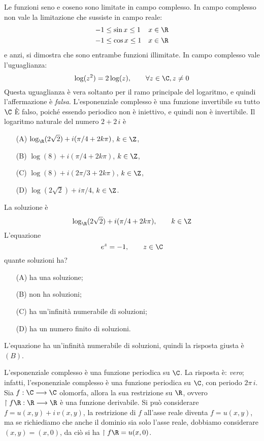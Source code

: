 Le funzioni seno e coseno sono limitate in campo complesso.
    In campo complesso non vale la limitazione che sussiste in campo reale: \begin{align*}
        -1 &\le \sin x \le  1 & x&\in \R \\
        -1 &\le \cos x \le 1 & x&\in \R 
    \end{align*}e anzi, si dimostra che sono entrambe funzioni illimitate.
In campo complesso vale l'uguaglianza: \[\log(z^2)=2\log(z) , \qquad  \forall z \in\C , z\neq0\]
    Questa uguaglianza è vera soltanto per il ramo principale del logaritmo, e quindi l'affermazione è \emph{falsa}.
    L'esponenziale complesso è una funzione invertibile su tutto $ \C $
    È falso, poiché essendo periodico non è iniettivo, e quindi non è invertibile.
    Il logaritmo naturale del numero $ 2+2\,i $ è \begin{itemize}
        \item[(A)] $\log_{\R} (2\sqrt{2})+i(\pi/4+2k\pi)$, $ k \in \Z $, 
        \item[(B)] $\log(8)+i(\pi/4+2k\pi)$, $ k \in \Z $, 
        \item[(C)] $\log(8)+i(2\pi/3+2k\pi)$, $ k \in \Z $, 
        \item[(D)]$\log(2\sqrt{2})+i\pi/4$, $ k \in \Z $.
    \end{itemize}
    La soluzione è \[
        \log_{\R} (2\sqrt{2})+i(\pi/4+2k\pi),\qquad k \in \Z
    \]
    L'equazione \[
        e^{z} = -1,\qquad z \in \C
    \]quante soluzioni ha? \begin{itemize}
        \item[(A)] ha una soluzione; 
        \item[(B)] non ha soluzioni; 
        \item[(C)] ha un'infinità numerabile di soluzioni; 
        \item[(D)] ha un numero finito di soluzioni.
    \end{itemize}
    L'equazione ha un'infinità numerabile di soluzioni, quindi la risposta giusta è $(B)$. 

L'esponenziale complesso è una funzione periodica su $ \C $.
    La risposta è: \emph{vero}; infatti, l'esponenziale complesso è una funzione periodica su $ \C $, con periodo $ 2\pi \,i $.
    Sia $f : \C \longrightarrow \C$ olomorfa, allora la sua restrizione su $\R$, ovvero $\restriction{f}{\R} : \R \longrightarrow \R$ è una funzione derivabile.
    Si può considerare $f = u(x,y) + i\, v(x,y)$, la restrizione di $f$ all'asse reale diventa $f = u(x,y)$, ma se richiediamo che anche il dominio sia solo l'asse reale, dobbiamo considerare $(x,y) = (x,0)$, da ciò si ha
    $\restriction{f}{\R} = u(x,0)$. 
    
